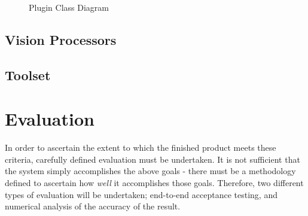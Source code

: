 \documentclass[a4paper,10pt]{article}
\begin{document}
\begin{figure}[h]
\begin{center}
        \normalsize
  \end{center}
  \caption{Plugin Class Diagram}
  \label{pluginclasses}
\end{figure}

\subsection{Vision Processors}

\subsection{Toolset}

\section{Evaluation}
In order to ascertain the extent to which the finished product meets these criteria, carefully defined evaluation must be undertaken. It is not sufficient that the system simply accomplishes the above goals - there must be a methodology defined to ascertain how \textit{well} it accomplishes those goals. Therefore, two different types of evaluation will be undertaken; end-to-end acceptance testing, and numerical analysis of the accuracy of the result.
\end{document}
